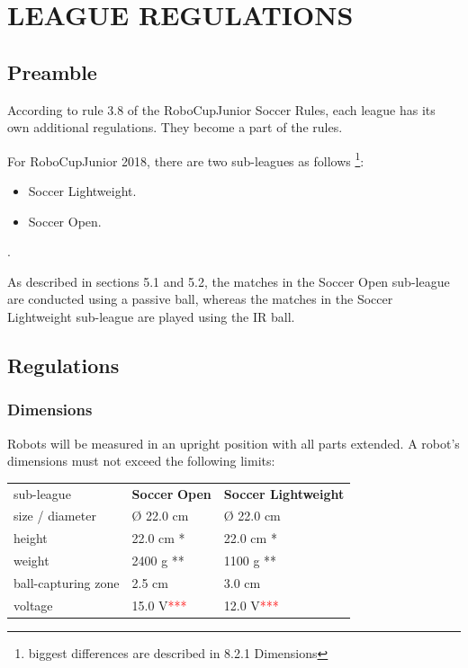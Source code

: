 \documentclass{article}
\begin{document}
\section{LEAGUE REGULATIONS \label{ref-052}}

\subsection{ Preamble \label{ref-053}}

According to rule 3.8 of the RoboCupJunior Soccer Rules, each league has its
own additional regulations. They become a part of the rules.

For RoboCupJunior 2018, there are two sub-leagues as follows
\footnote{biggest differences are described in 8.2.1 Dimensions}:

\begin{itemize}

\item Soccer Lightweight.

\item Soccer Open.

\end{itemize}

.

As described in sections 5.1 and 5.2, the matches in the Soccer Open sub-league
are conducted using a passive ball, whereas the matches in the Soccer
Lightweight sub-league are played using the IR ball.

\subsection{Regulations \label{ref-054}}

\subsubsection{Dimensions \label{ref-055}}

Robots will be measured in an upright position with all parts extended. A
robot's dimensions must not exceed the following limits:

\begin{table}
\begin{tabularx}{\textwidth}{
p{}
p{}
p{}}
sub-league & \textbf{Soccer} \textbf{Open} & \textbf{Soccer Lightweight} \\
size / diameter & \O{} 22.0 cm & \O{} 22.0 cm \\
height & 22.0 cm * & 22.0 cm * \\
weight & 2400 g ** & 1100 g ** \\
ball-capturing zone & 2.5 cm & 3.0 cm \\
voltage & 15.0 V\textcolor{red}{***} & 12.0 V\textcolor{red}{***} \\

\end{tabularx}

\end{table}
\end{document}
